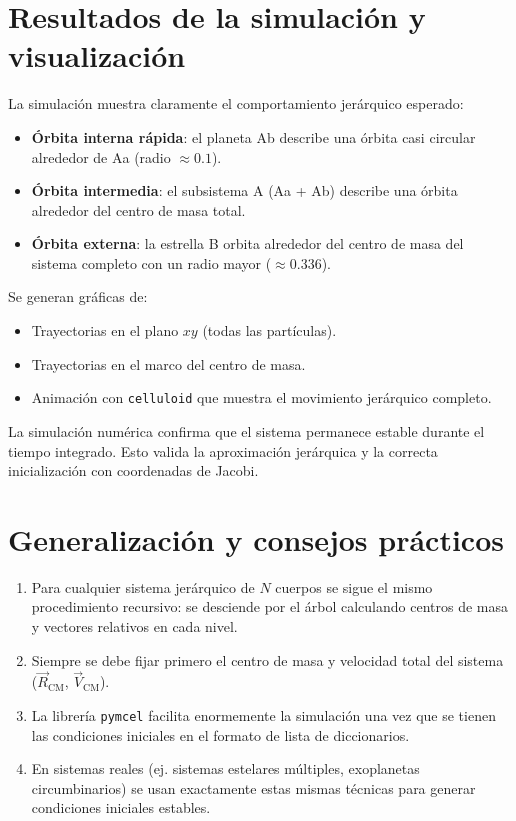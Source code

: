\documentclass[12pt,oneside]{book}
\begin{document}
\section{Resultados de la simulación y visualización}
La simulación muestra claramente el comportamiento jerárquico esperado:
\begin{itemize}
    \item \textbf{Órbita interna rápida}: el planeta Ab describe una órbita casi circular alrededor de Aa (radio \(\approx 0.1\)).
    \item \textbf{Órbita intermedia}: el subsistema A (Aa + Ab) describe una órbita alrededor del centro de masa total.
    \item \textbf{Órbita externa}: la estrella B orbita alrededor del centro de masa del sistema completo con un radio mayor (\(\approx 0.336\)).
\end{itemize}

Se generan gráficas de:
\begin{itemize}
    \item Trayectorias en el plano \(xy\) (todas las partículas).
    \item Trayectorias en el marco del centro de masa.
    \item Animación con \texttt{celluloid} que muestra el movimiento jerárquico completo.
\end{itemize}

\begin{importante}
La simulación numérica confirma que el sistema permanece estable durante el tiempo integrado. Esto valida la aproximación jerárquica y la correcta inicialización con coordenadas de Jacobi.
\end{importante}

\section{Generalización y consejos prácticos}
\begin{enumerate}
    \item Para cualquier sistema jerárquico de \(N\) cuerpos se sigue el mismo procedimiento recursivo: se desciende por el árbol calculando centros de masa y vectores relativos en cada nivel.
    \item Siempre se debe fijar primero el centro de masa y velocidad total del sistema (\(\vec{R}_{\text{CM}}\), \(\vec{V}_{\text{CM}}\)).
    \item La librería \texttt{pymcel} facilita enormemente la simulación una vez que se tienen las condiciones iniciales en el formato de lista de diccionarios.
    \item En sistemas reales (ej. sistemas estelares múltiples, exoplanetas circumbinarios) se usan exactamente estas mismas técnicas para generar condiciones iniciales estables.
\end{enumerate}
\end{document}
